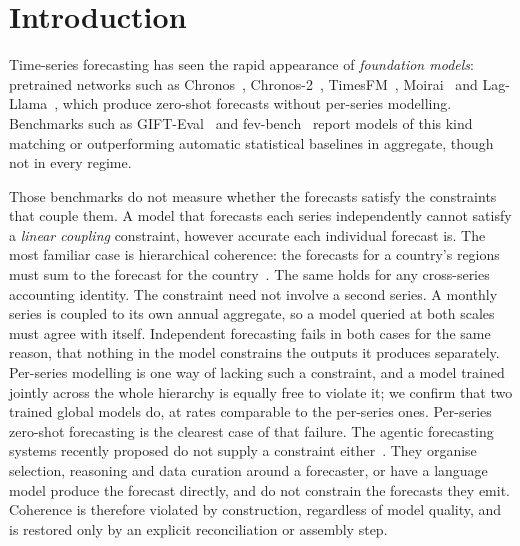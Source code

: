 \documentclass[review,number]{elsarticle}
\begin{document}
\linenumbers

\section{Introduction}
\label{sec:intro}
Time-series forecasting has seen the rapid appearance of \emph{foundation models}:
pretrained networks such as Chronos~\citep{chronos2024},
Chronos-2~\citep{chronos2_2025}, TimesFM~\citep{timesfm2024}, Moirai~\citep{moirai2024}
and
Lag-Llama~\citep{lagllama2024}, which produce zero-shot forecasts without per-series
modelling. Benchmarks such as GIFT-Eval~\citep{gifteval2024} and
fev-bench~\citep{fevbench2025} report models of this kind matching or outperforming
automatic statistical baselines in aggregate, though not in every regime.

Those benchmarks do not measure whether the forecasts satisfy the constraints that
couple them. A model that forecasts each
series independently cannot satisfy a \emph{linear coupling} constraint, however
accurate each individual forecast is. The most familiar case is hierarchical
coherence: the forecasts for a country's regions must sum to the forecast for the
country~\citep{mint2019,hfreview2024}. The same holds for any cross-series
accounting identity. The constraint need not involve a second series. A
monthly series is coupled to its own annual aggregate, so a model queried at both scales
must agree with itself. Independent forecasting fails in both cases for the same reason,
that nothing in the model constrains the outputs it produces separately. Per-series
modelling is one way of
lacking such a constraint, and a model trained jointly across the whole hierarchy is
equally free to violate it; we confirm that two trained global models do, at rates
comparable to the per-series ones. Per-series zero-shot forecasting is the clearest case of
that failure. The agentic forecasting systems recently proposed do not supply a
constraint either~\citep{tsci2025,nexus2026,dcats2025}. They organise selection,
reasoning and data curation around a forecaster, or have a language model produce the
forecast directly, and do not constrain the forecasts they emit.
Coherence is therefore violated by construction, regardless of model quality, and is
restored only by an explicit reconciliation or assembly step.
\end{document}
